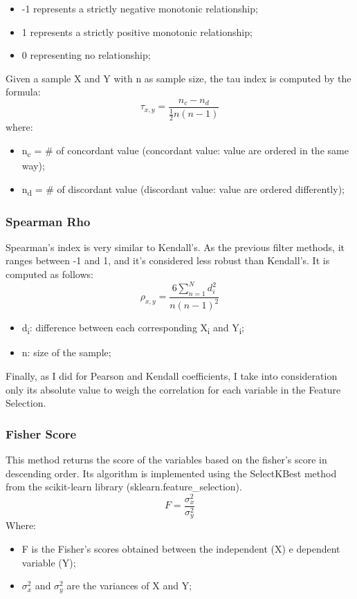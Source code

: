 \begin{itemize}
\item -1 represents a strictly negative monotonic relationship;
\item 1 represents a strictly positive monotonic relationship;
\item 0 representing no relationship;
\end{itemize}
Given a sample X and Y with n as sample size, the tau index is computed by the formula:
\begin{equation}
  \tau_{x,y} = \frac{n_c-n_d}{\frac{1}{2}n(n-1)}
\end{equation}
where:
\begin{itemize}
\item n\textsubscript{c} = \# of concordant value (concordant value: value are ordered in the same way);
\item n\textsubscript{d} = \# of discordant value (discordant value: value are ordered differently);
\end{itemize}
\subsubsection{Spearman Rho}
Spearman’s index is very similar to Kendall’s. As the previous filter methods, it ranges between -1 and 1, and it's considered less robust than Kendall's.
It is computed as follows:
\begin{equation}
\rho_{x,y} = \frac{6\sum_{n=1}^{N} d_i^2}{n(n-1)^2}
\end{equation}
\begin{itemize}
\item d\textsubscript{i}: difference between each corresponding X\textsubscript{i} and Y\textsubscript{i};
\item n: size of the sample;
\end{itemize}

Finally, as I did for Pearson and Kendall coefficients, I take into consideration only its absolute value to weigh the correlation for each variable in the Feature Selection.

\subsubsection{Fisher Score}
This method returns the score of the variables based on the fisher’s score in descending order. \newline
Its algorithm is implemented using the SelectKBest method from the scikit-learn library (sklearn.feature\_selection).\newline
\begin{equation}
F = \frac{\sigma_x^2}{\sigma_y^2}
\end{equation}
Where:
\begin{itemize}
\item F is the Fisher's scores obtained between the independent (X) e dependent variable (Y);
    \item $\sigma_x^2$ and $\sigma_y^2$ are the variances of X and Y;
\end{itemize}
\bigbreak
